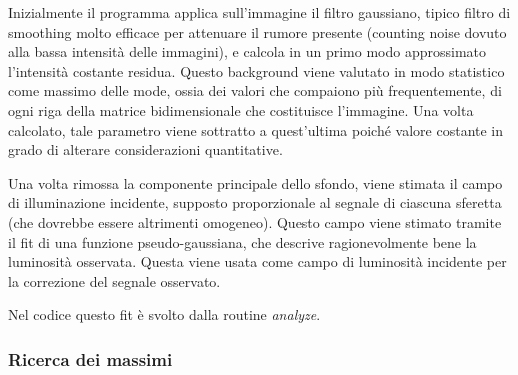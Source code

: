 Inizialmente il programma applica sull'immagine il filtro gaussiano, tipico filtro di smoothing molto efficace per attenuare il rumore presente (counting noise dovuto alla bassa intensità delle immagini), e calcola in un primo modo approssimato l'intensità costante residua.
Questo background viene valutato in modo statistico come massimo delle mode, ossia dei valori che compaiono più frequentemente, di ogni riga della matrice bidimensionale che costituisce l'immagine. 
Una volta calcolato, tale parametro viene sottratto a quest'ultima poiché valore costante in grado di alterare considerazioni quantitative.

Una volta rimossa la componente principale dello sfondo, viene stimata il campo di illuminazione incidente, supposto proporzionale al segnale di ciascuna sferetta (che dovrebbe essere altrimenti omogeneo).
Questo campo viene stimato tramite il fit di una funzione pseudo-gaussiana, che descrive ragionevolmente bene la luminosità osservata.
Questa viene usata come campo di luminosità incidente per la correzione del segnale osservato.

Nel codice questo fit è svolto dalla routine \textit{analyze}.

\subsubsection*{Ricerca dei massimi}

